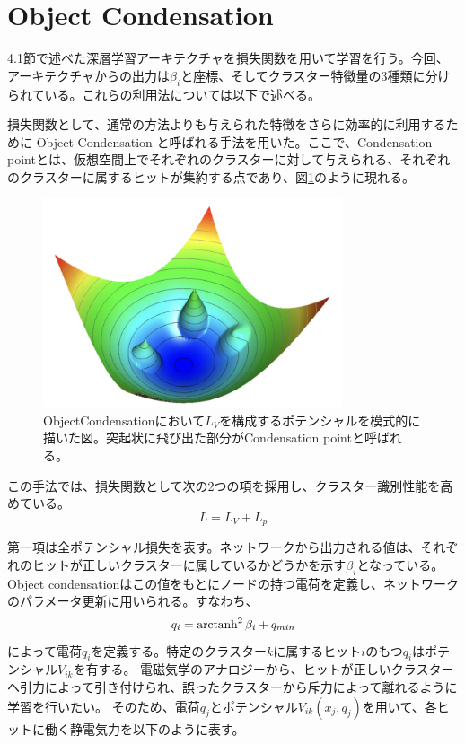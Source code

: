 \section{Object Condensation}
4.1節で述べた深層学習アーキテクチャを損失関数を用いて学習を行う。今回、アーキテクチャからの出力は$\beta_i$と座標、そしてクラスター特徴量の3種類に分けられている。これらの利用法については以下で述べる。

損失関数として、通常の方法よりも与えられた特徴をさらに効率的に利用するために Object Condensation\cite{GravNet_Object} と呼ばれる手法を用いた。ここで、Condensation pointとは、仮想空間上でそれぞれのクラスターに対して与えられる、それぞれのクラスターに属するヒットが集約する点であり、図\ref{ObjectCondensation}のように現れる。
\begin{figure}[H]
	\begin{center}
		\includegraphics[width=250pt]{./Figure/DLAnalysis/oc.png}
		\caption[ObjectCondensation]{ObjectCondensation\cite{StandardModel}において$L_V$を構成するポテンシャルを模式的に描いた図。突起状に飛び出た部分がCondensation pointと呼ばれる。}
		\label{ObjectCondensation}
	\end{center}
\end{figure}

この手法では、損失関数として次の2つの項を採用し、クラスター識別性能を高めている。
\begin{equation}
L=L_V + L_p
\end{equation}

第一項は全ポテンシャル損失を表す。ネットワークから出力される値は、それぞれのヒットが正しいクラスターに属しているかどうかを示す$\beta_i$となっている。Object condensationはこの値をもとにノードの持つ電荷を定義し、ネットワークのパラメータ更新に用いられる。すなわち、
\begin{equation}
q_i =\operatorname{arctanh}^2\beta_i + q_{min}
\end{equation}
によって電荷$q_i$を定義する。特定のクラスター$k$に属するヒット$i$のもつ$q_i$はポテンシャル$V_{ik}$を有する。
電磁気学のアナロジーから、ヒットが正しいクラスターへ引力によって引き付けられ、誤ったクラスターから斥力によって離れるように学習を行いたい。
そのため、電荷$q_j$とポテンシャル$V_{ik}(x_j,q_j)$を用いて、各ヒットに働く静電気力を以下のように表す。

